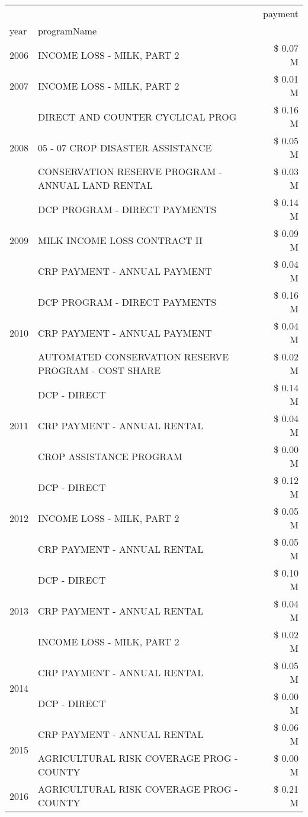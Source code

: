 \begin{tabular}{llr}
\toprule
 &  & payment \\
year & programName &  \\
\midrule
2006 & INCOME LOSS - MILK, PART 2 & \$ 0.07 M \\
\cline{1-3}
2007 & INCOME LOSS - MILK, PART 2 & \$ 0.01 M \\
\cline{1-3}
\multirow[t]{3}{*}{2008} & DIRECT AND COUNTER CYCLICAL PROG & \$ 0.16 M \\
 & 05 - 07 CROP DISASTER ASSISTANCE & \$ 0.05 M \\
 & CONSERVATION RESERVE PROGRAM - ANNUAL LAND RENTAL & \$ 0.03 M \\
\cline{1-3}
\multirow[t]{3}{*}{2009} & DCP PROGRAM - DIRECT PAYMENTS & \$ 0.14 M \\
 & MILK INCOME LOSS CONTRACT II & \$ 0.09 M \\
 & CRP PAYMENT - ANNUAL PAYMENT & \$ 0.04 M \\
\cline{1-3}
\multirow[t]{3}{*}{2010} & DCP PROGRAM - DIRECT PAYMENTS & \$ 0.16 M \\
 & CRP PAYMENT - ANNUAL PAYMENT & \$ 0.04 M \\
 & AUTOMATED CONSERVATION RESERVE PROGRAM - COST SHARE & \$ 0.02 M \\
\cline{1-3}
\multirow[t]{3}{*}{2011} & DCP - DIRECT & \$ 0.14 M \\
 & CRP PAYMENT - ANNUAL RENTAL & \$ 0.04 M \\
 & CROP ASSISTANCE PROGRAM & \$ 0.00 M \\
\cline{1-3}
\multirow[t]{3}{*}{2012} & DCP - DIRECT & \$ 0.12 M \\
 & INCOME LOSS - MILK, PART 2 & \$ 0.05 M \\
 & CRP PAYMENT - ANNUAL RENTAL & \$ 0.05 M \\
\cline{1-3}
\multirow[t]{3}{*}{2013} & DCP - DIRECT & \$ 0.10 M \\
 & CRP PAYMENT - ANNUAL RENTAL & \$ 0.04 M \\
 & INCOME LOSS - MILK, PART 2 & \$ 0.02 M \\
\cline{1-3}
\multirow[t]{2}{*}{2014} & CRP PAYMENT - ANNUAL RENTAL & \$ 0.05 M \\
 & DCP - DIRECT & \$ 0.00 M \\
\cline{1-3}
\multirow[t]{2}{*}{2015} & CRP PAYMENT - ANNUAL RENTAL & \$ 0.06 M \\
 & AGRICULTURAL RISK COVERAGE PROG - COUNTY & \$ 0.00 M \\
\cline{1-3}
\multirow[t]{3}{*}{2016} & AGRICULTURAL RISK COVERAGE PROG - COUNTY & \$ 0.21 M \\

\end{tabular}
